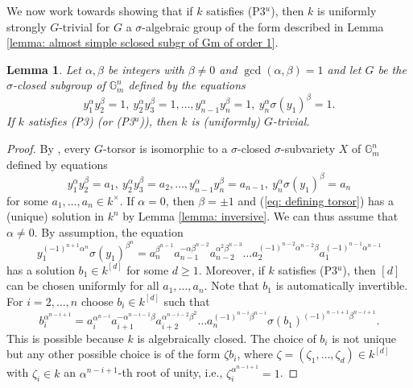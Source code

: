 \documentclass[oneside,reqno]{amsart}
\newtheorem{lemma}[theo]{Lemma}
\theoremstyle{definition}
\newcommand{\s}{\sigma}
\newcommand{\Gm}{\mathbb{G}_m}
\newcommand{\pt}{{\rm{(P3$^u$)}}}
\newcommand{\ptweak}{{\rm{(P3)}}}
\begin{document}
We now work towards showing that if $k$ satisfies \pt{}, then $k$ is uniformly strongly $G$-trivial for $G$ a $\s$-algebraic group of the form described in Lemma \ref{lemma: almost simple sclosed subgr of Gm of order 1}. 

\begin{lemma} \label{lemma: special long group}
	Let $\alpha,\beta$ be integers with $\beta\neq 0$ and $\gcd(\alpha,\beta)=1$ and let $G$ be the $\s$-closed subgroup of $\Gm^n$ defined by the equations $$y_1^{\alpha}y_2^{\beta}=1,\ y_2^{\alpha}y_3^{\beta}=1,\ldots, y_{n-1}^\alpha y_n^\beta=1,\ y_n^\alpha\s(y_1)^\beta=1.$$ If $k$ satisfies \ptweak{} (or \pt{}), then $k$ is (uniformly) $G$-trivial.	
\end{lemma}
\begin{proof}
	By \cite[Example 4.2]{BachmayrWibmer:TorsorsForDifferenceAlgebraicGroups}, every $G$-torsor is isomorphic to a $\s$-closed $\s$-subvariety $X$ of $\Gm^n$ defined by equations
	\begin{equation} \label{eq: defining torsor}
		y_1^{\alpha}y_2^{\beta}=a_1,\ y_2^{\alpha}y_3^{\beta}=a_2,\ldots, y_{n-1}^\alpha y_n^\beta=a_{n-1},\ y_n^\alpha\s(y_1)^\beta=a_n
	\end{equation}
	for some $a_1,\ldots,a_n\in k^\times$. If $\alpha=0$, then $\beta=\pm1$ and (\ref{eq: defining torsor}) has a (unique) solution in $k^n$ by Lemma \ref{lemma: inversive}. We can thus assume that $\alpha\neq 0$.
	By assumption, the equation
	\begin{equation} \label{eq: eq for b1}
		y_1^{(-1)^{n+1}\alpha^n}\s(y_1)^{\beta^n}=a_n^{\beta^{n-1}}a_{n-1}^{-\alpha\beta^{n-2}}a_{n-2}^{\alpha^2\beta^{n-3}}\ldots a_2^{(-1)^{n-2}\alpha^{n-2}\beta} a_1^{(-1)^{n-1}\alpha^{n-1}}
	\end{equation}
	has a solution $b_1\in k^{[d]}$ for some $d\geq 1$.  Moreover, if $k$ satisfies \pt{}, then $[d]$ can be chosen uniformly for all $a_1,\ldots,a_n$. Note that $b_1$ is automatically invertible. For $i=2,\ldots,n$ choose $b_i\in k^{[d]}$ such that
	\begin{equation} \label{eq: for bi}
		b_i^{\alpha^{n-i+1}}=a_i^{\alpha^{n-i}}a_{i+1}^{-\alpha^{n-i-1}\beta}a_{i+2}^{\alpha^{n-i-2}\beta^2}\ldots a_n^{(-1)^{n-i}\beta^{n-i}}\s(b_1)^{(-1)^{n-i+1}\beta^{n-i+1}}.
	\end{equation}
	This is possible because $k$ is algebraically closed. The choice of $b_i$ is not unique but any other possible choice is of the form $\zeta b_i$, where $\zeta=(\zeta_1,\ldots,\zeta_d)\in k^{[d]}$ with $\zeta_i\in k$ an $\alpha^{n-i+1}$-th root of unity, i.e., $\zeta_i^{\alpha^{n-i+1}}=1$. 

\end{proof}
\end{document}
